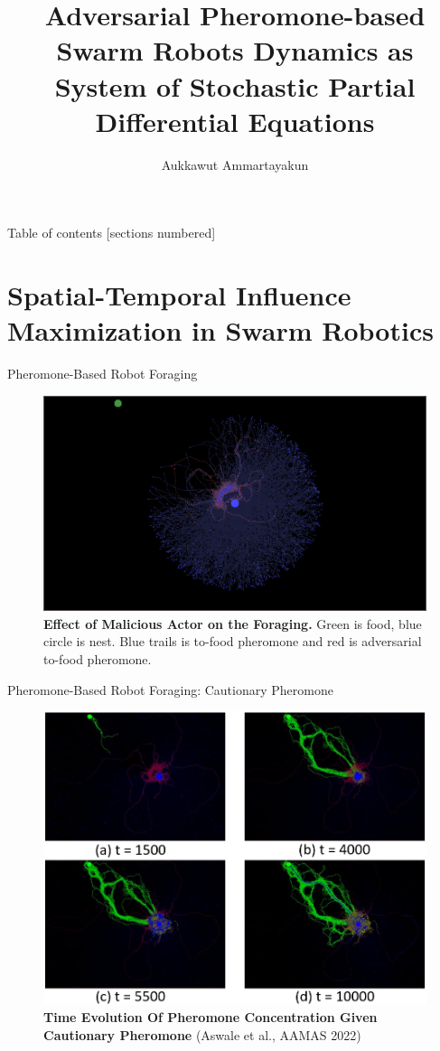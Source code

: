 \documentclass[10pt]{beamer}
\title{Adversarial Pheromone-based Swarm Robots Dynamics as System of Stochastic Partial Differential Equations}
\date{}
\author{Aukkawut Ammartayakun}
\institute{University of Tennessee, Knoxville}
\begin{document}
\maketitle
\begin{frame}{Table of contents}
  [sections numbered]
  \tableofcontents%
\end{frame}
\section{Spatial-Temporal Influence Maximization in Swarm Robotics}
\begin{frame}{Pheromone-Based Robot Foraging}
\begin{figure}
    \centering
    \includegraphics[width=1\linewidth]{DetractorWall.png}
    \caption{\textbf{Effect of Malicious Actor on the Foraging.} Green is food, blue circle is nest. Blue trails is to-food pheromone and red is adversarial to-food pheromone.}
    \label{fig:2}
\end{figure}
\end{frame}
\begin{frame}{Pheromone-Based Robot Foraging: Cautionary Pheromone}
\begin{figure}
    \centering
    \includegraphics[width=0.8\linewidth]{counter_timeline.png}
    \caption{\textbf{Time Evolution Of Pheromone Concentration Given Cautionary Pheromone} (Aswale et al., AAMAS 2022)}
    \label{fig:2}
\end{figure}
\end{frame}
\end{document}
